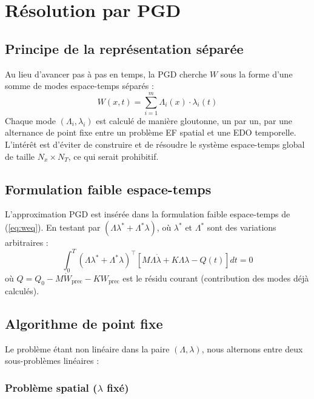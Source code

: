 \documentclass[11pt,a4paper]{article}
\begin{document}
\section{Résolution par PGD}

\subsection{Principe de la représentation séparée}

Au lieu d'avancer pas à pas en temps, la PGD cherche $W$ sous la forme d'une somme
de modes espace-temps séparés :
\begin{equation}
    W(x,t) = \sum_{i=1}^{m} \Lambda_i(x)\cdot\lambda_i(t)
    \label{eq:pgd_sep}
\end{equation}
Chaque mode $(\Lambda_i, \lambda_i)$ est calculé de manière gloutonne, un par un,
par une alternance de point fixe entre un problème EF spatial et une EDO temporelle.
L'intérêt est d'éviter de construire et de résoudre le système espace-temps global
de taille $N_x \times N_T$, ce qui serait prohibitif.

\subsection{Formulation faible espace-temps}

L'approximation PGD est insérée dans la formulation faible espace-temps de
(\ref{eq:weq}). En testant par $(\Lambda\lambda^* + \Lambda^*\lambda)$, où
$\lambda^*$ et $\Lambda^*$ sont des variations arbitraires :
\begin{equation}
    \int_0^T (\Lambda\lambda^* + \Lambda^*\lambda)^\top
    \left[M\Lambda\dot{\lambda} + K\Lambda\lambda - Q(t)\right]dt = 0
    \label{eq:pgd_weak}
\end{equation}
où $Q = Q_0 - M\dot{W}_{\text{prec}} - KW_{\text{prec}}$ est le résidu courant
(contribution des modes déjà calculés).

\subsection{Algorithme de point fixe}

Le problème étant non linéaire dans la paire $(\Lambda, \lambda)$,
nous alternons entre deux sous-problèmes linéaires :

\subsubsection{Problème spatial ($\lambda$ fixé)}
\end{document}
